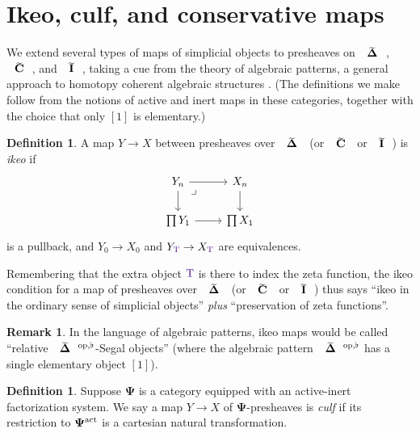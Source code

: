 \documentclass{amsart}
\makeatletter
\newcommand{\inert}{\mathbf{I}}
\newcommand{\contr}{\mathbf{C}}
\newcommand{\gencopatt}{\mathbf{\Psi}}
\newcommand{\simpl}{\mathbf{\Delta}}
\newcommand{\op}{\textup{op}}
\newcommand*\wt[1]{\mathpalette\wthelper{#1}}
\newcommand*\wthelper[2]{%
        \hbox{\dimen@\accentfontxheight#1%
                \accentfontxheight#11.3\dimen@
                $\m@th#1\widetilde{#2}$%
                \accentfontxheight#1\dimen@
        }%
}
\newcommand*\accentfontxheight[1]{%
        \fontdimen5\ifx#1\displaystyle
                \textfont
        \else\ifx#1\textstyle
                \textfont
        \else\ifx#1\scriptstyle
                \scriptfont
        \else
                \scriptscriptfont
        \fi\fi\fi3
}
\newcommand{\Tsimpl}{\wt\simpl}
\newcommand{\Tcontr}{\wt\contr}
\newcommand{\Tinert}{\wt\inert}
\newcommand{\Tob}{\textup{\color{Indigo}T}}
\newcommand{\actrm}{\textup{act}}
\theoremstyle{definition}
\newtheorem{definition}[theorem]{Definition}
\newtheorem{remark}[theorem]{Remark}
\theoremstyle{noname}
\makeatother
\begin{document}
\section{Ikeo, culf, and conservative maps}
\label{sec map properties}

We extend several types of maps of simplicial objects to presheaves on $\Tsimpl$, $\Tcontr$, and $\Tinert$, taking a cue from the theory of algebraic patterns, a general approach to homotopy coherent algebraic structures \cite{Chu-Haugseng:1907.03977,BarkanHaugsengSteinebrunner:EAP}.
(The definitions we make follow from the notions of active and inert maps in these categories, together with the choice that only $[1]$ is elementary.)



\begin{definition}
A map $Y \to X$ between presheaves over $\Tsimpl$ (or $\Tcontr$ or $\Tinert$) is \emph{ikeo}
if 
\[ \begin{tikzcd}
Y_n \rar \dar \ar[dr,phantom, very near start, "\lrcorner"] & X_n \dar \\
\prod Y_1 \rar & \prod X_1
\end{tikzcd} \]
is a pullback, and $Y_0 \to X_0$ and $Y_\Tob \to X_\Tob$ are equivalences.
\end{definition}


Remembering that the extra object $\Tob$ is 
there to index the zeta function, the ikeo condition for a map of presheaves over $\Tsimpl$ (or $\Tcontr$ or $\Tinert$) thus says ``ikeo in the ordinary sense of simplicial objects'' {\em plus} 
``preservation of zeta functions''.

\begin{remark}\label{rmk rel segal}
In the language of algebraic patterns, ikeo maps would be called ``relative 
$\Tsimpl^{\op,\flat}$-Segal objects'' \cite[Definition 3.1.8]{BarkanHaugsengSteinebrunner:EAP} (where the algebraic pattern $\Tsimpl^{\op,\flat}$ has a single elementary object $[1]$).
\end{remark}

\begin{definition}\label{def generalized culf}
Suppose $\gencopatt$ is a category equipped with an active-inert factorization system.
We say a map $Y \to X$ of $\gencopatt$-presheaves is \emph{culf} if its
restriction to $\gencopatt^\actrm$ is a cartesian natural transformation.
\end{definition}
\end{document}
